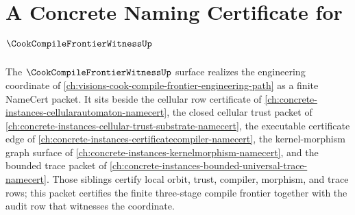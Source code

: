 \chapter{A Concrete Naming Certificate for $\CookCompileFrontierWitnessUp$}
\label{ch:concrete-instances-cookcompilefrontierwitness-namecert}

The $\CookCompileFrontierWitnessUp$ surface realizes the engineering coordinate of \autoref{ch:visions-cook-compile-frontier-engineering-path} as a finite NameCert packet. It sits beside the cellular row certificate of \autoref{ch:concrete-instances-cellularautomaton-namecert}, the closed cellular trust packet of \autoref{ch:concrete-instances-cellular-trust-substrate-namecert}, the executable certificate edge of \autoref{ch:concrete-instances-certificatecompiler-namecert}, the kernel-morphism graph surface of \autoref{ch:concrete-instances-kernelmorphism-namecert}, and the bounded trace packet of \autoref{ch:concrete-instances-bounded-universal-trace-namecert}. Those siblings certify local orbit, trust, compiler, morphism, and trace rows; this packet certifies the finite three-stage compile frontier together with the audit row that witnesses the coordinate.



